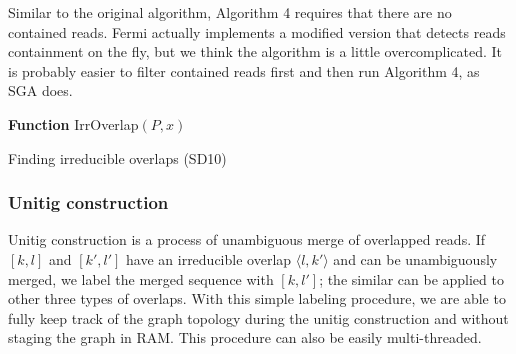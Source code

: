 \documentclass{bioinfo}
\begin{document}
\begin{methods}
Similar to the original algorithm, Algorithm 4 requires that there are no contained reads.
Fermi actually implements a modified version that detects reads containment on the fly,
but we think the algorithm is a little overcomplicated. It is probably easier to
filter contained reads first and then run Algorithm 4, as SGA does.

\begin{algorithm}[h]
\DontPrintSemicolon
\footnotesize
{}
\BlankLine
\textbf{Function} {\sc IrrOverlap}$(P,x)$
\caption{Finding irreducible overlaps (SD10)}
\end{algorithm}

\subsubsection{Unitig construction}

Unitig construction is a process of unambiguous merge of overlapped reads.
If $[k,l]$ and $[k',l']$ have an irreducible overlap $\langle l,k'\rangle$ and
can be unambiguously merged, we label the merged sequence with $[k,l']$; the
similar can be applied to other three types of overlaps.  With this simple
labeling procedure, we are able to fully keep track of the graph topology
during the unitig construction and without staging the graph in RAM.  This
procedure can also be easily multi-threaded.


\end{methods}
\end{document}
